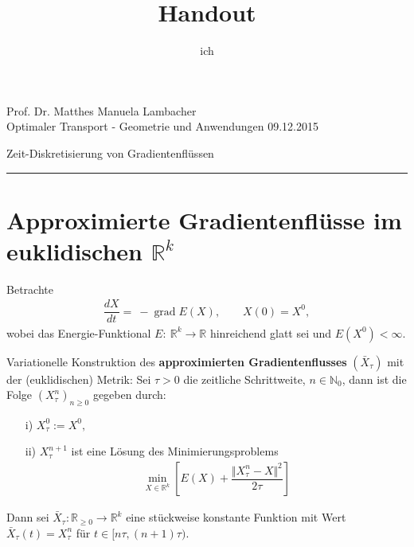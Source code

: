 \documentclass[11pt,a4paper,notitlepage]{scrreprt}
\author{ich}
\title{Handout}
\newcommand{\RR}{\mathbb{R}}
\newcommand{\NN}{\mathbb{N}}
\newcommand{\grad}{\operatorname{grad}}
\begin{document}
\parindent 0pt



\pagestyle{empty}



 Prof. Dr. Matthes \hfill Manuela Lambacher\\
 Optimaler Transport - Geometrie und Anwendungen \hfill 09.12.2015
 \begin{center}
  {\huge{Zeit-Diskretisierung von Gradientenflüssen}} 
 \end{center}
 \vspace{4pt}
 \hrule
 
\renewcommand{\thechapter}{\arabic{section}}
\renewcommand{\thesection}{\arabic{section}}
\section{Approximierte Gradientenflüsse im euklidischen $\RR^k$}

Betrachte \begin{eqnarray}
\dfrac{dX}{dt}=~-\grad E(X),~~~~~~~~~X(0)=X^0, \label{eq1}
\end{eqnarray} wobei das Energie-Funktional $E:~\RR^k\to\RR$ hinreichend glatt sei und $E(X^0)<\infty$. 
\vspace{14pt}

Variationelle Konstruktion des \textbf{approximierten Gradientenflusses} $(\bar{X}_\tau)$ mit der (euklidischen) Metrik:\newline
Sei $\tau > 0$ die zeitliche Schrittweite, $n\in\NN_0$, dann ist die Folge $\left( X^n_\tau \right)_{n\geq 0}$ gegeben durch:
\begin{itemize}
\item[i)]$X_\tau^0:=X^0,$
\item[ii)]$X_\tau^{n+1}$ ist eine Lösung des Minimierungsproblems
\begin{eqnarray}
\min_{X\in\RR^k}\left[E(X)+\dfrac{\Vert X_\tau^n-X\Vert^2}{2\tau}\right] \label{Min}
\end{eqnarray}
\end{itemize}
Dann sei $\bar{X}_\tau:\RR_{\geq0}\to\RR^k$ eine stückweise konstante Funktion mit Wert $\bar{X}_\tau(t)=X^n_\tau$ für ${t\in [n\tau,(n+1)\tau)}$. 

\vspace{12pt}
\end{document}
